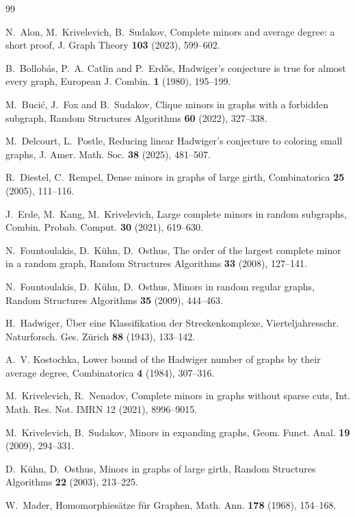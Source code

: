 \documentclass[11pt,a4paper]{article}
\theoremstyle{definition}
\theoremstyle{remark}
\begin{document}
{\small
\begin{thebibliography}{99}

N.~Alon, M.~Krivelevich, B.~Sudakov,
Complete minors and average degree: a short proof,
J. Graph Theory \textbf{103} (2023), 599--602.

B.~Bollob\'as, P.~A. Catlin and P.~Erd\H{o}s,
Hadwiger's conjecture is true for almost every graph,
European J. Combin. \textbf{1} (1980), 195--199.

M.~Buci\'c, J.~Fox and B.~Sudakov,
Clique minors in graphs with a forbidden subgraph,
Random Structures Algorithms \textbf{60} (2022), 327--338.

M.~Delcourt, L.~Postle,
Reducing linear Hadwiger's conjecture to coloring small graphs,
J. Amer. Math. Soc. \textbf{38} (2025), 481--507.

R.~Diestel, C.~Rempel,
Dense minors in graphs of large girth,
Combinatorica \textbf{25} (2005), 111--116.

J.~Erde, M.~Kang, M.~Krivelevich,
Large complete minors in random subgraphs,
Combin. Probab. Comput. \textbf{30} (2021), 619--630.

N.~Fountoulakis, D.~K\"uhn,  D.~Osthus,
The order of the largest complete minor in a random graph,
Random Structures Algorithms \textbf{33} (2008), 127--141.

N.~Fountoulakis, D.~K\"uhn,  D.~Osthus,
Minors in random regular graphs,
Random Structures Algorithms \textbf{35} (2009), 444--463.

H.~Hadwiger,
{\"U}ber eine Klassifikation der Streckenkomplexe,
Vierteljahresschr. Naturforsch. Ges. Z{\"u}rich \textbf{88} (1943), 133--142.

A.~V. Kostochka,
Lower bound of the Hadwiger number of graphs by their average degree,
Combinatorica \textbf{4} (1984), 307--316.

M.~Krivelevich, R.~Nenadov,
Complete minors in graphs without sparse cuts,
Int. Math. Res. Not. IMRN 12 (2021), 8996--9015.

M.~Krivelevich,  B.~Sudakov,
Minors in expanding graphs,
Geom. Funct. Anal. \textbf{19} (2009), 294--331.

D.~K\"uhn, D.~Osthus,
Minors in graphs of large girth,
Random Structures Algorithms \textbf{22} (2003), 213--225.

W.~Mader,
Homomorphies{\"a}tze f{\"u}r Graphen,
Math. Ann. \textbf{178} (1968), 154--168.


\end{thebibliography}}
\end{document}
